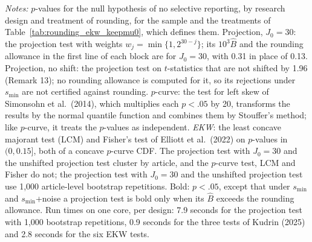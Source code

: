 \begin{table}[htbp]
\medskip
\begin{minipage}{\linewidth}
\footnotesize
\textit{Notes:} $p$-values for the null hypothesis of no selective reporting, by research design and treatment of rounding, for the sample and the treatments of Table~\ref{tab:rounding_ekw_keepmu0}, which defines them.
Projection, $J_0=30$: the projection test with weights $w_j=\min\{1,2^{30-j}\}$; its $10^3\widehat{B}$ and the rounding allowance in the first line of each block are for $J_0=30$, with 0.31 in place of 0.13.
Projection, no shift: the projection test on $t$-statistics that are not shifted by 1.96 (Remark 13); no rounding allowance is computed for it, so its rejections under $s_{\min}$ are not certified against rounding.
$p$-curve: the test for left skew of Simonsohn et al.\ (2014), which multiplies each $p<.05$ by 20, transforms the results by the normal quantile function and combines them by Stouffer's method; like $p$-curve, it treats the $p$-values as independent.
\textit{EKW}: the least concave majorant test (LCM) and Fisher's test of Elliott et al.\ (2022) on $p$-values in $(0,0.15]$, both of a concave $p$-curve CDF.
The projection test with $J_0=30$ and the unshifted projection test cluster by article, and the $p$-curve test, LCM and Fisher do not; the projection test with $J_0=30$ and the unshifted projection test use 1,000 article-level bootstrap repetitions.
Bold: $p<.05$, except that under $s_{\min}$ and $s_{\min}$+noise a projection test is bold only when its $\widehat{B}$ exceeds the rounding allowance.
Run times on one core, per design: 7.9 seconds for the projection test with 1,000 bootstrap repetitions, 0.9 seconds for the three tests of Kudrin (2025) and 2.8 seconds for the six EKW tests.
\end{minipage}
\end{table}
